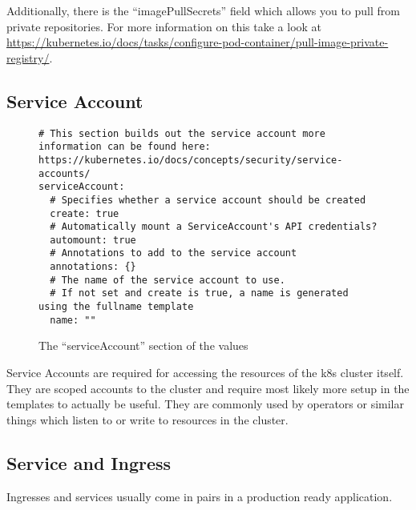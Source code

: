Additionally, there is the \enquote{imagePullSecrets} field which allows you to pull from private repositories. For more information on this take a look at \url{https://kubernetes.io/docs/tasks/configure-pod-container/pull-image-private-registry/}.


\subsection{Service Account}

\begin{figure}[h]
\begin{verbatim}
# This section builds out the service account more information can be found here: https://kubernetes.io/docs/concepts/security/service-accounts/
serviceAccount:
  # Specifies whether a service account should be created
  create: true
  # Automatically mount a ServiceAccount's API credentials?
  automount: true
  # Annotations to add to the service account
  annotations: {}
  # The name of the service account to use.
  # If not set and create is true, a name is generated using the fullname template
  name: ""
\end{verbatim}
\caption{The \enquote{serviceAccount} section of the \gls{values}}\label{code:service_account_section}
\end{figure}

Service Accounts are required for accessing the resources of the \gls{k8s} cluster itself.
They are scoped accounts to the cluster and require most likely more setup in the templates to actually be useful.
They are commonly used by operators or similar things which listen to or write to resources in the cluster.

\subsection{Service and Ingress}

Ingresses and services usually come in pairs in a production ready application.

